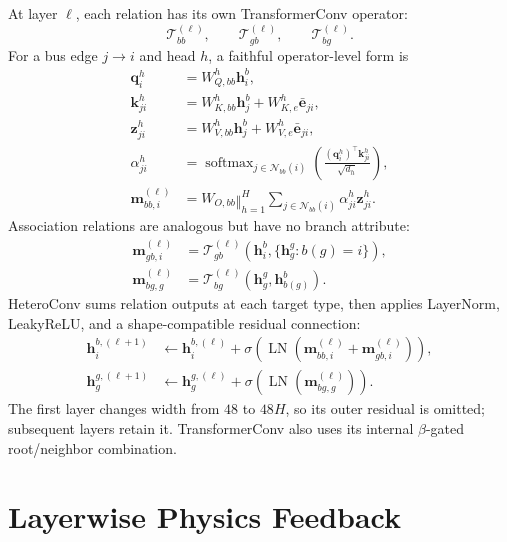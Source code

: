 \documentclass[10pt]{article}
\newcommand{\LN}{\operatorname{LN}}
\begin{document}
At layer \(\ell\), each relation has its own TransformerConv operator:
\begin{equation}
 \mathcal T_{bb}^{(\ell)},\qquad
 \mathcal T_{gb}^{(\ell)},\qquad
 \mathcal T_{bg}^{(\ell)}.
\end{equation}
For a bus edge \(j\to i\) and head \(h\), a faithful operator-level form is
\begin{align}
 \bm q_i^{h}&=W_{Q,bb}^{h}\bm h_i^b,\\
 \bm k_{ji}^{h}&=W_{K,bb}^{h}\bm h_j^b+W_{K,e}^{h}\bar{\bm e}_{ji},\\
 \bm z_{ji}^{h}&=W_{V,bb}^{h}\bm h_j^b+W_{V,e}^{h}\bar{\bm e}_{ji},\\
 \alpha_{ji}^{h}&=\operatorname{softmax}_{j\in\mathcal N_{bb}(i)}
 \left(\frac{(\bm q_i^h)^\top\bm k_{ji}^h}{\sqrt{d_h}}\right),\\
 \bm m_{bb,i}^{(\ell)}&=W_{O,bb}\mathop{\Vert}_{h=1}^{H}
 \sum_{j\in\mathcal N_{bb}(i)}\alpha_{ji}^{h}\bm z_{ji}^{h}.
\end{align}
Association relations are analogous but have no branch attribute:
\begin{align}
 \bm m_{gb,i}^{(\ell)}&=\mathcal T_{gb}^{(\ell)}
 (\bm h_i^b,\{\bm h_g^g:b(g)=i\}),\\
 \bm m_{bg,g}^{(\ell)}&=\mathcal T_{bg}^{(\ell)}
 (\bm h_g^g,\bm h_{b(g)}^b).
\end{align}
HeteroConv sums relation outputs at each target type, then applies
LayerNorm, LeakyReLU, and a shape-compatible residual connection:
\begin{align}
 \bm h_i^{b,(\ell+1)}&\leftarrow \bm h_i^{b,(\ell)}+
 \sigma\!\left(\LN(\bm m_{bb,i}^{(\ell)}+\bm m_{gb,i}^{(\ell)})\right),\\
 \bm h_g^{g,(\ell+1)}&\leftarrow \bm h_g^{g,(\ell)}+
 \sigma\!\left(\LN(\bm m_{bg,g}^{(\ell)})\right).
\end{align}
The first layer changes width from \(48\) to \(48H\), so its outer residual is
omitted; subsequent layers retain it. TransformerConv also uses its internal
\(\beta\)-gated root/neighbor combination.

\section{Layerwise Physics Feedback}
\end{document}

